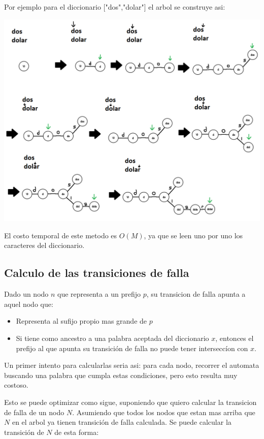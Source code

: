 \documentclass{article}
\begin{document}
Por ejemplo para el diccionario ["dos","dolar"] el arbol se construye asi:

\begin{center}
\includegraphics[scale=0.3]{Imagenes/construccion_arbol_dos_dolar.png}
\end{center}

El costo temporal de este metodo es $O(M)$, ya que se leen uno por uno los caracteres del diccionario.

\subsection*{Calculo de las transiciones de falla}
Dado un nodo $n$ que representa a un prefijo $p$, su transicion de falla apunta a aquel nodo que:

\begin{itemize}
    \item Representa al sufijo propio mas grande de $p$
    \item Si tiene como ancestro a una palabra aceptada del diccionario $x$, entonces el prefijo al que apunta
    su transición de falla no puede tener interseccíon con $x$.
\end{itemize}

Un primer intento para calcularlas seria asi: para cada nodo, recorrer el automata buscando una palabra
que cumpla estas condiciones, pero esto resulta muy costoso.

Esto se puede optimizar como sigue, suponiendo que quiero calcular
la transicion de falla de un nodo $N$. Asumiendo que todos los nodos que estan mas arriba que $N$ en el arbol
ya tienen transición de falla calculada. Se puede calcular la transición de $N$ de esta forma:
\end{document}
